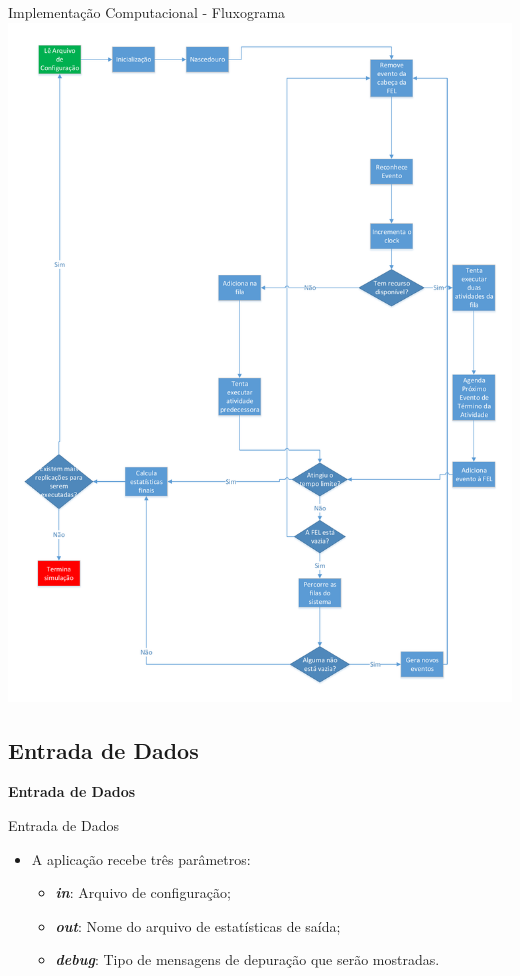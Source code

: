 \documentclass[xcolor=dvipsnames]{beamer}
\let\olditem=\item%
\renewcommand{\item}{\olditem \justifying}%
\begin{document}
\begin{frame}{Implementação Computacional - Fluxograma}
	\centering
	\includegraphics[width=0.5\linewidth]{model.pdf}
\end{frame}
	
\subsection{Entrada de Dados}
	
\begin{frame}{}
	\centering
	\Huge \color{blue} \textbf{Entrada de Dados}
\end{frame}
	
\begin{frame}{Entrada de Dados}
	\begin{itemize}
		\item A aplicação recebe três parâmetros:
		      \bigskip
		      \begin{itemize}
		      	\item \textbf{\textit{in}}: Arquivo de configuração;
		      	      \bigskip
		      	\item \textbf{\textit{out}}: Nome do arquivo de estatísticas de saída;
		      	      \bigskip
		      	\item \textbf{\textit{debug}}: Tipo de mensagens de depuração que serão mostradas.
		      	      \bigskip
		      \end{itemize}
	\end{itemize}
\end{frame}
	
\end{document}
